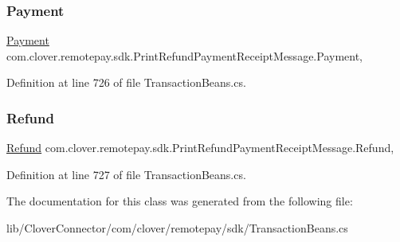 \subsubsection{\texorpdfstring{Payment}{Payment}}
{\footnotesize\ttfamily \hyperlink{classcom_1_1clover_1_1sdk_1_1v3_1_1payments_1_1_payment}{Payment} com.\+clover.\+remotepay.\+sdk.\+Print\+Refund\+Payment\+Receipt\+Message.\+Payment\hspace{0.3cm}{\ttfamily [get]}, {\ttfamily [set]}}



Definition at line 726 of file Transaction\+Beans.\+cs.

\mbox{\label{classcom_1_1clover_1_1remotepay_1_1sdk_1_1_print_refund_payment_receipt_message_af5134cd99b8a029446d3311c877b1ad7}} 
\subsubsection{\texorpdfstring{Refund}{Refund}}
{\footnotesize\ttfamily \hyperlink{classcom_1_1clover_1_1sdk_1_1v3_1_1payments_1_1_refund}{Refund} com.\+clover.\+remotepay.\+sdk.\+Print\+Refund\+Payment\+Receipt\+Message.\+Refund\hspace{0.3cm}{\ttfamily [get]}, {\ttfamily [set]}}



Definition at line 727 of file Transaction\+Beans.\+cs.



The documentation for this class was generated from the following file\+:\begin{DoxyCompactItemize}
\item 
lib/\+Clover\+Connector/com/clover/remotepay/sdk/Transaction\+Beans.\+cs\end{DoxyCompactItemize}
